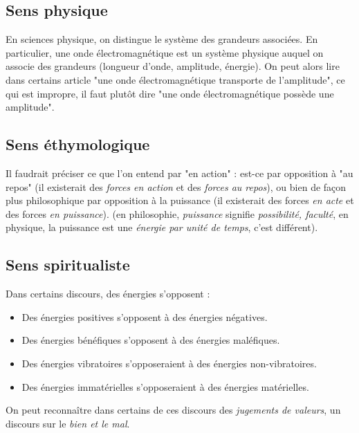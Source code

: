 \subsection{Sens physique}
En sciences physique, on distingue le système des grandeurs associées. En particulier, une onde électromagnétique est un système physique auquel on associe des grandeurs (longueur d'onde, amplitude, énergie). On peut alors lire dans certains article "une onde électromagnétique transporte de l'amplitude", ce qui est impropre, il faut plutôt dire "une onde électromagnétique possède une amplitude".

\subsection{Sens éthymologique}
Il faudrait préciser ce que l'on entend par "en action" : est-ce par opposition à "au repos" (il existerait des {\it forces en action} et des {\it forces au repos}), ou bien de façon plus philosophique par opposition à la puissance (il existerait des forces {\it en acte} et des forces {\it en puissance}). (en philosophie, {\it puissance} signifie {\it possibilité, faculté}, en physique, la puissance est une {\it énergie par unité de temps}, c'est différent).

\subsection{Sens spiritualiste}
Dans certains discours, des énergies s'opposent :
\begin{itemize}[leftmargin=1cm, label=, itemsep=1pt]
\item Des énergies positives s'opposent à des énergies négatives.
\item Des énergies bénéfiques s'opposent à des énergies maléfiques.
\item Des énergies vibratoires s'opposeraient à des énergies non-vibratoires.
\item Des énergies immatérielles s'opposeraient à des énergies matérielles.
\end{itemize}
On peut reconnaître dans certains de ces discours des {\it jugements de valeurs}, un discours sur le {\it bien et le mal}.
